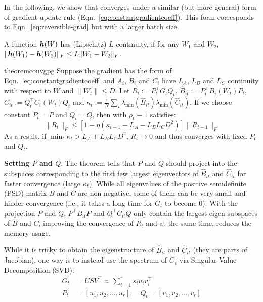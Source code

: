 In the following, we show that \lowrank{} converges under a similar (but more general) form of gradient update rule (Eqn.~\ref{eq:constantgradientcoeff}). This form corresponds to Eqn.~\ref{eq:reversible-grad} but with a larger batch size.  

\def\ee{\mathbb{E}}
\def\cW{\mathcal{W}}
\def\cN{\mathcal{N}}




\begin{definition}[$L$-continuity]
A function ${\bm{h}}(W)$ has (Lipschitz) $L$-continuity, if for any $W_1$ and $W_2$, $\|{\bm{h}}(W_1) - {\bm{h}}(W_2)\|_F \le L\|W_1-W_2\|_F$. 
\end{definition}

\begin{restatable}{theorem}{convgpg}
    \label{thm:convgpg}
    Suppose the gradient has the form of Eqn.~\ref{eq:constantgradientcoeff} and $A_i$, $B_i$ and $C_i$ have $L_A$, $L_B$ and $L_C$ continuity with respect to $W$ and $\|W_t\|\le D$. Let $R_t := P_t^\top G_t Q_t$, $\hat B_{it} := P_t^\top B_{i}(W_t) P_t$, $\hat C_{it} := Q_t^\top C_i(W_t) Q_t$ and $\kappa_t := \frac1N \sum_i \lambda_{\min}(\hat B_{it}) \lambda_{\min}(\hat C_{it})$. If we choose constant $P_t = P$ and $Q_t=Q$, then \lowrank{} with $\rho_t \equiv 1$ satisfies:
    \begin{equation}
        \|R_t\|_F \le \left[1\!-\!\eta(\kappa_{t-1}\!-\!L_A\!-\!L_B L_C D^2)\right]\|R_{t-1}\|_F \label{eq:converge-rt}
    \end{equation}
    As a result, if $\min_t \kappa_t > L_A + L_B L_C D^2$, $R_t \rightarrow 0$ and thus \lowrank{} converges with fixed $P_t$ and $Q_t$.
\end{restatable}
\textbf{Setting $P$ and $Q$}. The theorem tells that $P$ and $Q$ should project into the subspaces corresponding to the first few largest eigenvectors of $\hat B_{it}$ and $\hat C_{it}$ for faster convergence (large $\kappa_t$). While all eigenvalues of the positive semidefinite (PSD) matrix $B$ and $C$ are non-negative, some of them can be very small and hinder convergence (i.e., it takes a long time for $G_t$ to become $0$). With the projection $P$ and $Q$, $P^\top B_{it} P$ and $Q^\top C_{it} Q$ only contain the largest eigen subspaces of $B$ and $C$, improving the convergence of $R_t$ and at the same time, reduces the memory usage. 

While it is tricky to obtain the eigenstructure of $\hat B_{it}$ and $\hat C_{it}$ (they are parts of Jacobian), one way is to instead use the spectrum of $G_t$ via Singular Value Decomposition (SVD): 
\begin{align}
    \label{eq:svd_p_q}
    G_t &= U S V^{\top} \approx \sum_{i=1}^{r} s_{i} u_{i} v_{i}^{\top} \\
    P_t &= [u_1, u_2, ..., u_r], 
    \quad
    Q_t = [v_1, v_2, ..., v_r]
\end{align}


